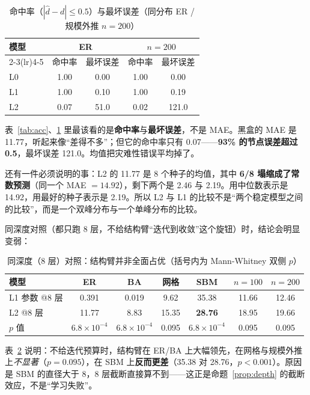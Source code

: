 \begin{table}[H]
\centering
\caption{命中率（$|\hat d-d|\le0.5$）与最坏误差（同分布 ER / 规模外推 $n{=}200$）}
\label{tab:hit}
\small
\setlength{\tabcolsep}{5pt}
\begin{tabular}{lcccc}
\toprule
\multirow{2}{*}{模型} & \multicolumn{2}{c}{ER} & \multicolumn{2}{c}{$n{=}200$} \\
\cmidrule(lr){2-3}\cmidrule(lr){4-5}
 & 命中率 & 最坏误差 & 命中率 & 最坏误差 \\
\midrule
L0 & 1.00 & 0.00 & 1.00 & 0.00 \\
L1 & 1.00 & 0.10 & 1.00 & 0.19 \\
L2 & 0.07 & 51.0 & 0.02 & 121.0 \\
\bottomrule
\end{tabular}
\end{table}

表~\ref{tab:acc}、\ref{tab:hit} 里最该看的是\textbf{命中率}与\textbf{最坏误差}，不是 MAE。黑盒的 MAE 是 11.77，听起来像“差得不多”；但它的命中率只有 0.07——\textbf{93\% 的节点误差超过 0.5}，最坏误差 121.0。均值把灾难性错误平均掉了。

还有一件必须说明的事：L2 的 11.77 是 8 个种子的均值，其中 \textbf{6/8 塌缩成了常数预测}（同一个 MAE $=14.92$），剩下两个是 2.46 与 2.19。用中位数表示是 14.92，用最好的种子表示是 2.19。所以 L2 与 L1 的比较不是“两个稳定模型之间的比较”，而是一个双峰分布与一个单峰分布的比较。

同深度对照（都只跑 8 层，不给结构臂“迭代到收敛”这个旋钮）时，结论会明显变弱：

\begin{table}[H]
\centering
\caption{同深度（8 层）对照：结构臂并非全面占优（括号内为 Mann-Whitney 双侧 $p$）}
\label{tab:same}
\small
\setlength{\tabcolsep}{4pt}
\begin{tabular}{lcccccc}
\toprule
模型 & ER & BA & 网格 & SBM & $n{=}100$ & $n{=}200$ \\
\midrule
L1 参数 @8 层 & 0.391 & 0.019 & 9.62 & 35.38 & 11.66 & 12.46 \\
L2 @8 层 & 11.77 & 8.83 & 15.35 & \textbf{28.76} & 18.95 & 19.66 \\
\midrule
$p$ 值 & $6.8\times10^{-4}$ & $6.8\times10^{-4}$ & 0.095 & $6.8\times10^{-4}$ & 0.095 & 0.095 \\
\bottomrule
\end{tabular}
\end{table}

表~\ref{tab:same} 说明：不给迭代预算时，结构臂在 ER/BA 上大幅领先，在网格与规模外推上\emph{不显著}（$p=0.095$），在 SBM 上\textbf{反而更差}（35.38 对 28.76，$p<0.001$）。原因是 SBM 的直径大于 8，8 层截断直接算不到——这正是命题~\ref{prop:depth} 的截断效应，不是“学习失败”。


